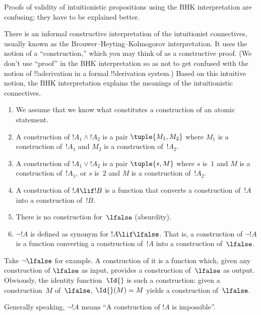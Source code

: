 \documentclass[../../../include/open-logic-section]{subfiles}
\begin{document}

\begin{editorial}
  Proofs of validity of intuitionistic propositions using the BHK
  interpretation are confusing; they have to be explained better.
\end{editorial}

There is an informal constructive interpretation of the intuitionist
connectives, usually known as the Brouwer--Heyting--Kolmogorov
interpretation. It uses the notion of a ``construction,'' which you
may think of as a constructive proof. (We don't use ``proof'' in the
BHK interpretation so as not to get confused with the notion of
!!a{derivation} in a formal !!{derivation} system.) Based on this intuitive
notion, the BHK interpretation explains the meanings of the
intuitionistic connectives.

\begin{enumerate}
\item We assume that we know what constitutes a construction of an atomic
  statement.
\item A construction of $!A_1 \land !A_2$ is a pair $\tuple{M_1, M_2}$
  where $M_1$ is a construction of~$!A_1$ and $M_2$ is a construction
  of~$!A_2$.
\item A construction of $!A_1 \lor !A_2$ is a pair $\tuple{s, M}$
  where $s$ is~$1$ and $M$ is a construction of~$!A_1$, or $s$ is~$2$
  and $M$ is a construction of~$!A_2$.
\item A construction of $!A \lif !B$ is a function that converts a
  construction of~$!A$ into a construction of~$!B$.
\item There is no construction for~$\lfalse$ (absurdity).
\item $\lnot !A$ is defined as synonym for $!A \lif \lfalse$. That is,
  a construction of $\lnot !A$ is a function converting a construction
  of~$!A$ into a construction of~$\lfalse$.
\end{enumerate}

\begin{ex}
Take $\lnot \lfalse$ for example. A construction of it is a function
which, given any construction of $\lfalse$ as input, provides a
construction of~$\lfalse$ as output. Obviously, the identity
function~$\Id{}$ is such a construction: given a construction~$M$
of~$\lfalse$, $\Id{}(M) = M$ yields a construction of~$\lfalse$.
\end{ex}

Generally speaking, $\lnot !A$ means ``A construction of $!A$ is impossible''.
\end{document}
